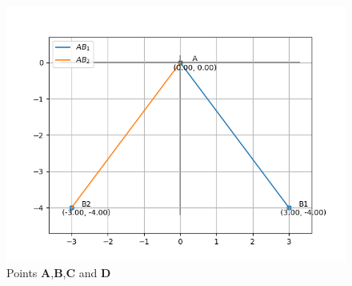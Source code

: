 \documentclass[journal]{IEEEtran}
\begin{document}
\begin{figure}[h]
    \centering
    \includegraphics[width=\columnwidth]{figs/fig0.png}
    \caption{Points \textbf{A},\textbf{B},\textbf{C} and \textbf{D}}
 \end{figure}
\end{document}
